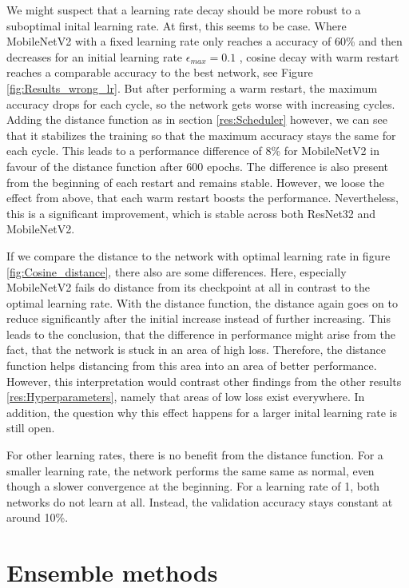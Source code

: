 We might suspect that a learning rate decay should be more robust to a
suboptimal inital learning rate. At first, this seems to be case. Where
MobileNetV2 with a fixed learning rate only reaches a accuracy of 60\% and then
decreases for an initial learning rate  $\epsilon_{max} = 0.1$ , cosine decay with
warm restart reaches a comparable accuracy to the best network, see Figure
\ref{fig:Results_wrong_lr}. But after performing a warm restart, the maximum
accuracy drops for each cycle, so the network gets worse with increasing cycles.
Adding the distance function as in section \ref{res:Scheduler} however, we
can see that it stabilizes the training so that the maximum accuracy stays the
same for each cycle. This leads to a performance difference of 8\% for
MobileNetV2 in favour of the distance function after 600 epochs. The difference
is also present from the beginning of each restart and remains stable. However,
we loose the effect from above, that each warm restart boosts the performance.
Nevertheless, this is a significant improvement, which is stable across both
ResNet32 and MobileNetV2.

If we compare the distance to the network with optimal learning rate in figure
\ref{fig:Cosine_distance}, there also are some differences. Here, especially
MobileNetV2 fails do distance from its checkpoint at all in contrast to the
optimal learning rate. With the distance function, the distance again goes on to
reduce significantly after the initial increase instead of further increasing.
This leads to the conclusion, that the difference in performance might arise
from the fact, that the network is stuck in an area of high loss. Therefore, the
distance function helps distancing from this area into an area of better
performance. However, this interpretation would contrast other findings from the
other results \ref{res:Hyperparameters}, namely that areas of low loss exist
everywhere. In addition, the question why this effect happens for a larger
inital learning rate is still open.

For other learning rates, there is no benefit from the distance function. For a
smaller learning rate, the network performs the same same as normal, even though
a slower convergence at the beginning. For a learning rate of 1, both networks
do not learn at all. Instead, the validation accuracy stays constant at around
10\%.

\pagebreak



\section{Ensemble methods}\label{res:Ensemble} 

